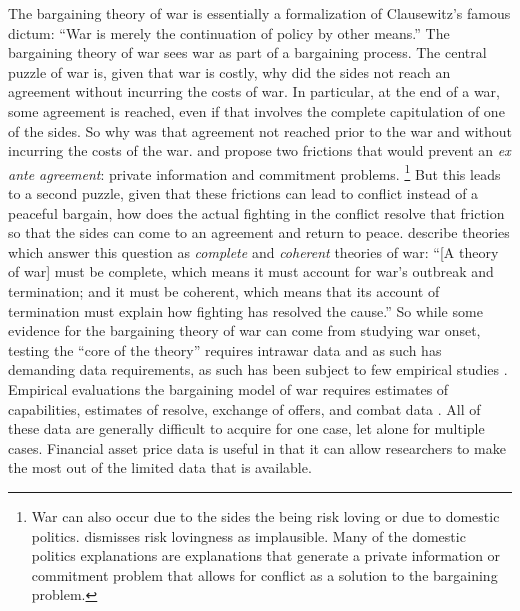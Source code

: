 The bargaining theory of war is essentially a formalization of Clausewitz's famous dictum: ``War is merely the continuation of policy by other means.'' \parencite[87]{Clausewitz1989}
The bargaining theory of war sees war as part of a bargaining process.
The central puzzle of war is, given that war is costly, why did the sides not reach an agreement without incurring the costs of war.
In particular, at the end of a war, some agreement is reached, even if that involves the complete capitulation of one of the sides.
So why was that agreement not reached prior to the war and without incurring the costs of the war.
\parencite{Fearon1995} and \parencite{Powell2006} propose two frictions that would prevent an \textit{ex ante agreement}: private information and commitment problems.%
\footnote{
  War can also occur due to the sides the being risk loving or due to domestic politics.
  \textcite{Fearon1995} dismisses risk lovingness as implausible.
  Many of the domestic politics explanations are explanations that generate a private information or commitment problem that allows for conflict as a solution to the bargaining problem.
}
But this leads to a second puzzle, given that these frictions can lead to conflict instead of a peaceful bargain, how does the actual fighting in the conflict resolve that friction so that the sides can come to an agreement and return to peace.
\textcite[757]{LeventogluSlantchev2007} describe theories which answer this question as \textit{complete} and \textit{coherent} theories of war: ``[A theory of war] must be complete, which means it must account for war’s outbreak and termination; and it must be coherent, which means that its account of termination must explain how fighting has resolved the cause.''
So while some evidence for the bargaining theory of war can come from studying war onset, testing the ``core of the theory'' requires intrawar data and as such has demanding data requirements, as such has been subject to few empirical studies \parencites{Reiter2003}{Ramsay2008}{Reiter2009}{Weisiger2015}.
Empirical evaluations the bargaining model of war requires estimates of capabilities, estimates of resolve, exchange of offers, and combat data \parencite{Reiter2003}.
All of these data are generally difficult to acquire for one case, let alone for multiple cases.
Financial asset price data is useful in that it can allow researchers to make the most out of the limited data that is available.


